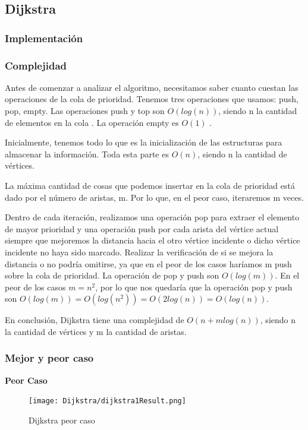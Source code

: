 \subsection{Dijkstra}
\subsubsection{Implementación}

\subsubsection{Complejidad}
Antes de comenzar a analizar el algoritmo, necesitamos saber cuanto cuestan las operaciones de la cola de prioridad. Tenemos tres operaciones que usamos: push, pop, empty. Las operaciones push y top son $O(log(n))$, siendo n la cantidad de elementos en la cola \cite{PRIORITY_POP}\cite{PRIORITY_PUSH}. La operación empty es $O(1)$ \cite{PRIORITY_EMPTY}.

Inicialmente, tenemos todo lo que es la inicialización de las estructuras para almacenar la información. Toda esta parte es $O(n)$, siendo n la cantidad de vértices.

La máxima cantidad de cosas que podemos insertar en la cola de prioridad está dado por el número de aristas, m. Por lo que, en el peor caso, iteraremos m veces.

Dentro de cada iteración, realizamos una operación pop para extraer el elemento de mayor prioridad y una operación push por cada arista del vértice actual siempre que mejoremos la distancia hacia el otro vértice incidente o dicho vértice incidente no haya sido marcado. Realizar la verificación de si se mejora la distancia o no podría omitirse, ya que en el peor de los casos haríamos m push sobre la cola de prioridad.
La operación de pop y push son $O(log(m))$. En el peor de los casos $m = n^2$, por lo que nos quedaría que la operación pop y push son $O(log(m)) = O(log(n^2)) = O(2log(n)) = O(log(n))$.

En conclusión, Dijkstra tiene una complejidad de $O(n + mlog(n))$, siendo n la cantidad de vértices y m la cantidad de aristas.

\subsubsection{Mejor y peor caso}
\textbf{Peor Caso}
\begin{figure}[H]
\centering
\texttt{[image: Dijkstra/dijkstra1Result.png]}
\caption{Dijkstra peor caso}
\end{figure}

